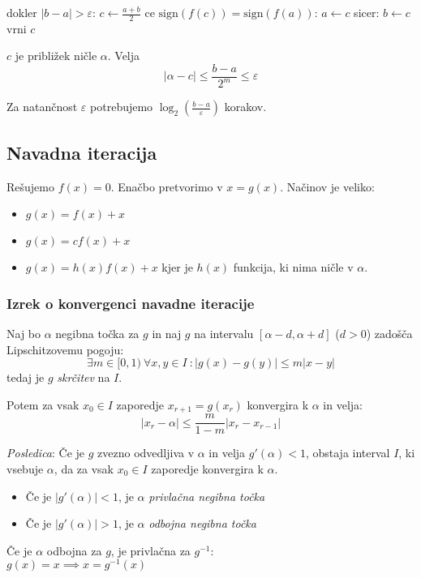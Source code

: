 \begin{multicols}{5}
\begin{koda}[]
dokler $|b-a| > \varepsilon$:
	$c \leftarrow \frac{a+b}{2}$
	ce $\text{sign}(f(c)) = \text{sign}(f(a))$:
		$a \leftarrow c$
	sicer:
		$b \leftarrow c$
vrni $c$
\end{koda}

$c$ je približek ničle $\alpha$. Velja
\[ |\alpha - c| \leq \frac{b-a}{2^m} \leq \varepsilon\]

Za natančnost $\varepsilon$ potrebujemo  $\log_2 \left( \frac{b-a}{\varepsilon}\right)$ korakov.


\subsection{Navadna iteracija}
Rešujemo $f(x) = 0$. Enačbo pretvorimo v $x = g(x)$. Načinov je veliko:
\begin{itemize}
	\item $g(x) = f(x) + x$
	\item $g(x) = cf(x) + x$
	\item $g(x) = h(x)f(x) + x$ kjer je $h(x)$ funkcija, ki nima ničle v $\alpha$.
\end{itemize}

\subsubsection{Izrek o konvergenci navadne iteracije}
Naj bo $\alpha$ negibna točka za $g$ in naj $g$ na intervalu $[\alpha - d, \alpha + d]$ ($d > 0$)
zadošča Lipschitzovemu pogoju:
\[ \exists m \in [0, 1)\ \forall x,y \in I\ : |g(x) - g(y)| \leq m |x-y| \]
tedaj je $g$ \textit{skrčitev} na $I$.

Potem za vsak $x_0 \in I$ zaporedje $x_{r+1} = g(x_r)$ konvergira k $\alpha$ in velja:
\[ |x_r - \alpha| \leq \frac{m}{1-m} |x_r - x_{r-1}| \]

\textit{Posledica}: Če je $g$ zvezno odvedljiva v $\alpha$ in velja $g'(\alpha) < 1$, obstaja interval $I$, ki vsebuje $\alpha$, da za vsak $x_0 \in I$ zaporedje konvergira k $\alpha$.

\begin{itemize}
	\item Če je $|g'(\alpha)| < 1$, je $\alpha$ \textit{privlačna negibna točka}
	\item Če je $|g'(\alpha)| > 1$, je $\alpha$ \textit{odbojna negibna točka}
\end{itemize}

Če je $\alpha$ odbojna za $g$, je privlačna za $g^{-1}$:\\ $g(x) = x \implies x = g^{-1}(x)$


\end{multicols}

